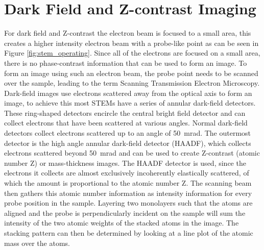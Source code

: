 \section{Dark Field and Z-contrast Imaging}
For dark field and Z-contrast the electron beam is focused to a small area, this creates a higher intensity electron beam with a probe-like point as can be seen in Figure \ref{fig:stem_operating}. Since all of the electrons are focused on a small area, there is no phase-contrast information that can be used to form an image. To form an image using such an electron beam, the probe point needs to be scanned over the sample, leading to the term Scanning Transmission Electron Microscopy.
Dark-field images use electrons scattered away from the optical axis to form an image, to achieve this most STEMs have a series of annular dark-field detectors.
These ring-shaped detectors encircle the central bright field detector and can collect electrons that have been scattered at various angles. Normal dark-field detectors collect electrons scattered up to an angle of \SI{50}{\milli \radian}. The outermost detector is the high angle annular dark-field detector (HAADF), which collects electrons scattered beyond \SI{50}{\milli \radian} and can be used to create Z-contrast (atomic number Z) or mass-thickness images.
The HAADF detector is used, since the electrons it collects are almost exclusively incoherently elastically scattered, of which the amount is proportional to the atomic number Z.
The scanning beam then gathers this atomic number information as intensity information for every probe position in the sample.
Layering two monolayers such that the atoms are aligned and the probe is perpendicularly incident on the sample will sum the intensity of the two atomic weights of the stacked atoms in the image. The stacking pattern can then be determined by looking at a line plot of the atomic mass over the atoms.  




